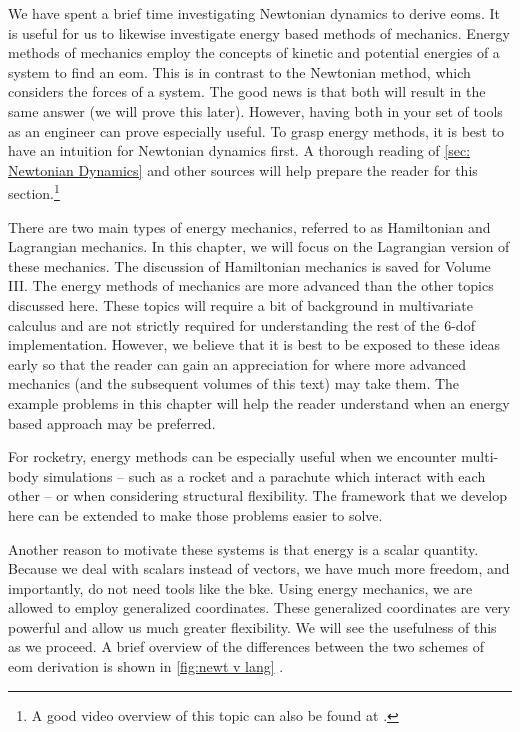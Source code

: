\documentclass[10pt, openany, titlepage]{book}
\theoremstyle{definition}
\newcounter{example}[chapter]
\let\oldautoref\autoref
\renewcommand{\autoref}[1]{%
  \begingroup
  \hypersetup{linkcolor=black}%
  \oldautoref{#1}%
  \endgroup
}
\begin{document}
We have spent a brief time investigating Newtonian dynamics to derive \glspl{eom}. It is useful for us to likewise investigate energy based methods of mechanics. Energy methods of mechanics employ the concepts of kinetic and potential energies of a system to find an \gls{eom}. This is in contrast to the Newtonian method, which considers the forces of a system. The good news is that both will result in the same answer (we will prove this later). However, having both in your set of tools as an engineer can prove especially useful. To grasp energy methods, it is best to have an intuition for Newtonian dynamics first. A thorough reading of \autoref{sec: Newtonian Dynamics} and other sources will help prepare the reader for this section.\footnote{A good video overview of this topic can also be found at \cite{veritasium_closest_2024}.}

There are two main types of energy mechanics, referred to as Hamiltonian and \gls{Lagrangian} mechanics. In this chapter, we will focus on the \gls{Lagrangian} version of these mechanics. The discussion of Hamiltonian mechanics is saved for Volume III. The energy methods of mechanics are more advanced than the other topics discussed here. These topics will require a bit of background in multivariate calculus and are not strictly required for understanding the rest of the 6-\gls{dof} implementation. However, we believe that it is best to be exposed to these ideas early so that the reader can gain an appreciation for where more advanced mechanics (and the subsequent volumes of this text) may take them. The example problems in this chapter will help the reader understand when an energy based approach may be preferred.

For rocketry, energy methods can be especially useful when we encounter multi-body simulations -- such as a rocket and a parachute which interact with each other -- or when considering structural flexibility.  The framework that we develop here can be extended to make those problems easier to solve.

Another reason to motivate these systems is that energy is a scalar quantity. Because we deal with scalars instead of vectors, we have much more freedom, and importantly, do not need tools like the \gls{bke}. Using energy mechanics, we are allowed to employ \glspl{generalized coordinate}. These \glspl{generalized coordinate} are very powerful and allow us much greater flexibility. We will see the usefulness of this as we proceed. A brief overview of the differences between the two schemes of \gls{eom} derivation is shown in \autoref{fig:newt v lang}.
\end{document}
